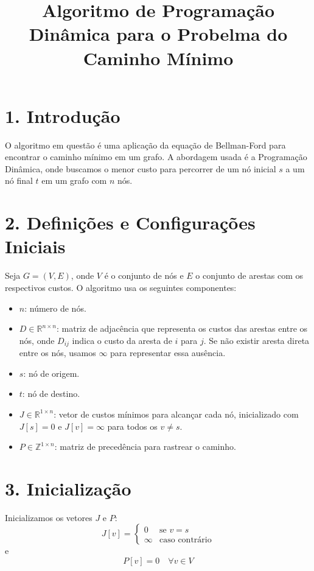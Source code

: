 \documentclass{article}
\begin{document}
\title{Algoritmo de Programação Dinâmica para o Probelma do Caminho Mínimo}
\author{}
\date{}
\maketitle

\section*{1. Introdução}
O algoritmo em questão é uma aplicação da equação de Bellman-Ford para encontrar o caminho mínimo em um grafo. A abordagem usada é a Programação Dinâmica, onde buscamos o menor custo para percorrer de um nó inicial \( s \) a um nó final \( t \) em um grafo com \( n \) nós.

\section*{2. Definições e Configurações Iniciais}
Seja \( G = (V, E) \), onde \( V \) é o conjunto de nós e \( E \) o conjunto de arestas com os respectivos custos. O algoritmo usa os seguintes componentes:

\begin{itemize}
    \item \( n \): número de nós.
    \item \( D \in \mathbb{R}^{n \times n} \): matriz de adjacência que representa os custos das arestas entre os nós, onde \( D_{ij} \) indica o custo da aresta de \( i \) para \( j \). Se não existir aresta direta entre os nós, usamos \( \infty \) para representar essa ausência.
    \item \( s \): nó de origem.
    \item \( t \): nó de destino.
    \item \( J \in \mathbb{R}^{1 \times n} \): vetor de custos mínimos para alcançar cada nó, inicializado com \( J[s] = 0 \) e \( J[v] = \infty \) para todos os \( v \neq s \).
    \item \( P \in \mathbb{Z}^{1 \times n} \): matriz de precedência para rastrear o caminho.
\end{itemize}

\section*{3. Inicialização}
Inicializamos os vetores \( J \) e \( P \):
\[
J[v] = 
\begin{cases}
0 & \text{se } v = s \\
\infty & \text{caso contrário}
\end{cases}
\]
e
\[
P[v] = 0 \quad \forall v \in V
\]
\end{document}
